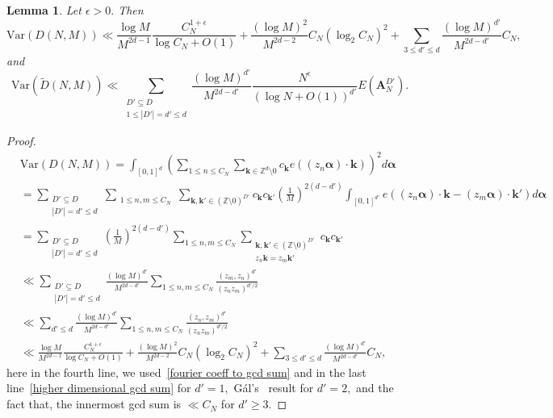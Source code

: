 \documentclass[12pt,article]{amsart}
\newtheorem{lemma}[theorem]{Lemma}
\theoremstyle{remark}
\numberwithin{equation}{section}
\newcommand{\Z}{\mathbb{Z}}
\newcommand{\Var}{\text{Var}}
\newcommand{\boldk}{\boldsymbol{k}}
\newcommand{\boldA}{\boldsymbol{A}}
\newcommand{\boldalpha}{\boldsymbol{\alpha}}
\begin{document}
	\begin{lemma}\label{lmthm2}
		Let $\epsilon>0.$ Then	 \[\Var(D(N,M))\ll
		\frac{\log M}{M^{2d-1}}\frac{C_N^{1+\epsilon}}{\log C_N+O(1)}+\frac{(\log M)^2}{M^{2d-2}}C_N(\log_2 C_N)^2+\sum_{3\leq d'\leq d}\frac{(\log M)^{d'}}{M^{2d-d'}}C_N,\] and
		\[\Var(\widetilde{D}(N,M))\ll\sum_{\substack{D'\subseteq D\\1\leq |D'|=d'\leq d}}\frac{(\log M)^{d'}}{M^{2d-d'}}\frac{N^{\epsilon}}{(\log N+O(1))^{d'}}E(\boldA_N^{D'}).\]
	\end{lemma}
	\begin{proof}
		\begin{align*} %
			&\Var(D(N,M))=\int_{[0,1]^d}\left(\sum_{1\leq n\leq C_N}\sum_{\boldk\in\Z^d\setminus0}c_{\boldk}e((z_n\boldalpha)\cdot\boldk)\right)^2d\boldalpha\nonumber\\
			&=\sum_{\substack{D'\subseteq D\\|D'|=d'\leq d}}\sum_{\substack{1\leq n,m\leq C_N}}\sum_{\boldk,\boldk'\in(\Z\setminus0)^{D'}}c_{\boldk}c_{\boldk'}\left(\frac{1}{M}\right)^{2(d-d')}\int_{[0,1]^{d'}}e((z_n\boldalpha)\cdot\boldk-(z_m\boldalpha)\cdot\boldk')d\boldalpha\nonumber\\
			&=\sum_{\substack{D'\subseteq D\\|D'|=d'\leq d}}\left(\frac{1}{M}\right)^{2(d-d')}\sum_{1\leq n,m\leq C_N}\sum_{\substack{\boldk,\boldk'\in(\Z\setminus0)^{D'}\\z_n\boldk=z_m\boldk'}}c_{\boldk}c_{\boldk'}\nonumber\\
			&\ll\sum_{\substack{D'\subseteq D\\|D'|=d'\leq d}}\frac{(\log M)^{d'}}{M^{2d-d'}}\sum_{1\leq n,m\leq C_N}\frac{(z_m,z_n)^{d'}}{(z_nz_m)^{d'/2}}\nonumber\\
			&\ll\sum_{d'\leq d}\frac{(\log M)^{d'}}{M^{2d-d'}}\sum_{1\leq n,m\leq C_N}\frac{(z_n,z_m)^{d'}}{(z_nz_m)^{d'/2}}\nonumber\\
			&\ll \frac{\log M}{M^{2d-1}}\frac{C_N^{1+\epsilon}}{\log C_N+O(1)}+\frac{(\log M)^2}{M^{2d-2}}C_N(\log_2 C_N)^2+\sum_{3\leq d'\leq d}\frac{(\log M)^{d'}}{M^{2d-d'}}C_N,
		\end{align*} 
		here in the fourth line, we used~\eqref{fourier coeff to gcd sum} and in the last line~\eqref{higher dimensional gcd sum} for $d'=1,$ G\'al's~\cite{gal} result for $d'=2,$ and the fact that, the innermost gcd sum is $\ll C_N$ for $d'\geq 3.$ 
		

\end{proof}
\end{document}
